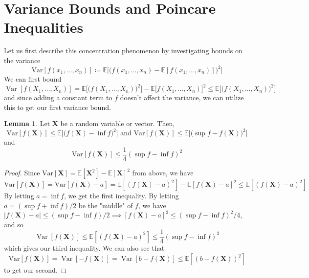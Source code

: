 \documentclass{article}
\DeclareMathOperator{\Var}{Var}
\theoremstyle{definition}
\newtheorem{lemma}[theorem]{Lemma}
\theoremstyle{remark}
\theoremstyle{definition}
\begin{document}
\section{Variance Bounds and Poincare Inequalities}

  Let us first describe this concentration phenomenon by investigating bounds on the variance 
  \[\mathrm{Var}[f(x_1, \ldots, x_n)] \coloneqq \mathbb{E}\big[ \big( f(x_1, \ldots, x_n) - \mathbb{E}[f(x_1, \ldots, x_n)] \big)^2 \big] \]
  We can first bound 
  \[\Var[f(X_1, \ldots, X_n)] = \mathbb{E}\big[ \big( f(X_1, \ldots, X_n)\big)^2 \big] - \mathbb{E}\big[ f(X_1, \ldots, X_n) \big]^2 \leq \mathbb{E}\big[ \big( f(X_1, \ldots, X_n)\big)^2 \big]\]
  and since adding a constant term to $f$ doesn't affect the variance, we can utilize this to get our first variance bound. 

  \begin{lemma}
  Let $\mathbf{X}$ be a random variable or vector. Then, 
  \[\mathrm{Var}[f(\mathbf{X})] \leq \mathbb{E} \big[ \big( f(\mathbf{X}) - \inf f \big)^2 \big] \text{ and } \mathrm{Var}[f(\mathbf{X})] \leq \mathbb{E} \big[ \big(\sup f - f(\mathbf{X}) \big)^2 \big]\]
  and 
  \[\mathrm{Var}[ f(\mathbf{X})] \leq \frac{1}{4} ( \sup f - \inf f)^2\]
  \end{lemma}
  \begin{proof} 
  Since $\mathrm{Var}[\mathbf{X}] = \mathbb{E}[\mathbf{X}^2] - \mathbb{E}[\mathbf{X}]^2$ from above, we have 
  \[\mathrm{Var}[ f(\mathbf{X})] = \mathrm{Var}[f(\mathbf{X}) - a] = \mathbb{E}[(f(\mathbf{X}) - a)^2] - \mathbb{E}[f(\mathbf{X}) - a]^2 \leq \mathbb{E}[(f(\mathbf{X}) - a)^2]\]
  By letting $a = \inf f$, we get the first inequality. By letting $a = (\sup f + \inf f) /2$ be the "middle" of $f$, we have $|f(\mathbf{X}) - a| \leq (\sup f - \inf f)/2 \implies [f(\mathbf{X}) - a]^2 \leq (\sup f - \inf f)^2/4$, and so 
  \[\Var[ f(\mathbf{X})] \leq \mathbb{E}[(f(\mathbf{X}) - a)^2] \leq \frac{1}{4} (\sup f - \inf f)^2\]
  which gives our third inequality. We can also see that 
  \[\mathrm{Var}[ f(\mathbf{X})] = \Var[ -f (\mathbf{X})] = \Var[ b - f(\mathbf{X})] \leq \mathbb{E}[ (b - f(\mathbf{X}))^2]\]
  to get our second. 
  \end{proof} 
\end{document}
